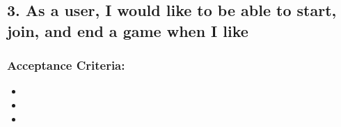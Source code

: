 \subsection*{3. As a user, I would like to be able to start, join, and end a game when I like}


\subsubsection*{Acceptance Criteria:}

\begin{itemize}
\item 
\item 
\item 
\end{itemize}
